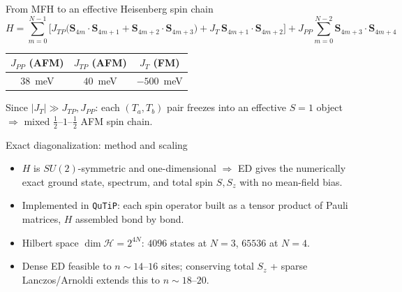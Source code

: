 \documentclass[aspectratio=169,11pt]{beamer}
\begin{document}
\begin{frame}{From MFH to an effective Heisenberg spin chain}
  \[
    H = \sum_{m=0}^{N-1}\Big[J_{TP}\big(\mathbf S_{4m}\!\cdot\!\mathbf S_{4m+1} + \mathbf S_{4m+2}\!\cdot\!\mathbf S_{4m+3}\big) + J_T\, \mathbf S_{4m+1}\!\cdot\!\mathbf S_{4m+2}\Big] + J_{PP}\!\!\sum_{m=0}^{N-2}\!\! \mathbf S_{4m+3}\!\cdot\!\mathbf S_{4m+4}
  \]
  \centering
  \vspace{1mm}
  \begin{center}
  \begin{tabular}{ccc}
    \toprule
    $J_{PP}$ (AFM) & $J_{TP}$ (AFM) & $J_T$ (FM) \\
    \midrule
    $38$~meV & $40$~meV & $-500$~meV \\
    \bottomrule
  \end{tabular}
  \end{center}
  Since $|J_T|\gg J_{TP},J_{PP}$: each $(T_a,T_b)$ pair freezes into an effective $S=1$ object $\Rightarrow$ mixed $\tfrac12$--$1$--$\tfrac12$ AFM spin chain.
\end{frame}

\begin{frame}{Exact diagonalization: method and scaling}
  \begin{itemize}
    \item $H$ is $SU(2)$-symmetric and one-dimensional $\Rightarrow$ ED gives the numerically exact ground state, spectrum, and total spin $S,S_z$ with no mean-field bias.
    \item Implemented in \texttt{QuTiP}: each spin operator built as a tensor product of Pauli matrices, $H$ assembled bond by bond.
    \item Hilbert space $\dim\mathcal H = 2^{4N}$: $4096$ states at $N=3$, $65536$ at $N=4$.
    \item Dense ED feasible to $n\sim14$--$16$ sites; conserving total $S_z$ + sparse Lanczos/Arnoldi extends this to $n\sim18$--$20$.
  \end{itemize}
\end{frame}
\end{document}
